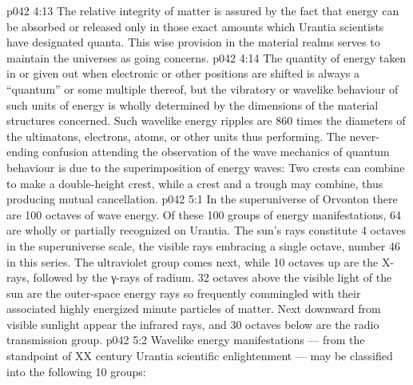 \vs p042 4:13 \pc The relative integrity of matter is assured by the fact that energy can be absorbed or released only in those exact amounts which Urantia scientists have designated quanta. This wise provision in the material realms serves to maintain the universes as going concerns.
\vs p042 4:14 The quantity of energy taken in or given out when electronic or other positions are shifted is always a “quantum” or some multiple thereof, but the vibratory or wavelike behaviour of such units of energy is wholly determined by the dimensions of the material structures concerned. Such wavelike energy ripples are 860 times the diameters of the ultimatons, electrons, atoms, or other units thus performing. The never\hyp{}ending confusion attending the observation of the wave mechanics of quantum behaviour is due to the superimposition of energy waves: Two crests can combine to make a double\hyp{}height crest, while a crest and a trough may combine, thus producing mutual cancellation.
\vs p042 5:1 In the superuniverse of Orvonton there are 100 octaves of wave energy. Of these 100 groups of energy manifestations, 64 are wholly or partially recognized on Urantia. The sun’s rays constitute 4 octaves in the superuniverse scale, the visible rays embracing a single octave, number 46 in this series. The ultraviolet group comes next, while 10 octaves up are the X\hyp{}rays, followed by the γ-rays of radium. 32 octaves above the visible light of the sun are the outer\hyp{}space energy rays so frequently commingled with their associated highly energized minute particles of matter. Next downward from visible sunlight appear the infrared rays, and 30 octaves below are the radio transmission group.
\vs p042 5:2 \pc Wavelike energy manifestations --- from the standpoint of XX century Urantia scientific enlightenment --- may be classified into the following 10 groups:
